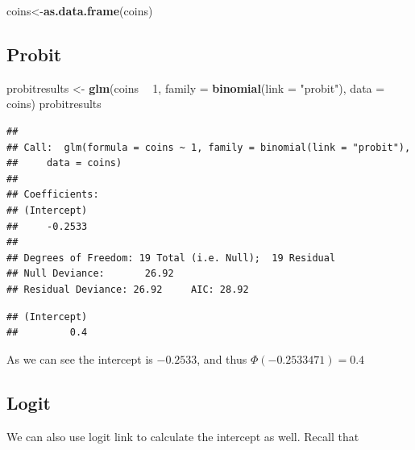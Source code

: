 \documentclass[
]{book}
\newenvironment{Shaded}{\begin{snugshade}}{\end{snugshade}}
\newcommand{\DataTypeTok}[1]{\textcolor[rgb]{0.13,0.29,0.53}{#1}}
\newcommand{\DecValTok}[1]{\textcolor[rgb]{0.00,0.00,0.81}{#1}}
\newcommand{\KeywordTok}[1]{\textcolor[rgb]{0.13,0.29,0.53}{\textbf{#1}}}
\newcommand{\NormalTok}[1]{#1}
\newcommand{\OperatorTok}[1]{\textcolor[rgb]{0.81,0.36,0.00}{\textbf{#1}}}
\newcommand{\StringTok}[1]{\textcolor[rgb]{0.31,0.60,0.02}{#1}}
\begin{document}
\begin{Shaded}
\begin{Highlighting}[]
\NormalTok{coins<-}\KeywordTok{as.data.frame}\NormalTok{(coins)}
\end{Highlighting}
\end{Shaded}

\hypertarget{probit-1}{%
\subsection{Probit}\label{probit-1}}

\begin{Shaded}
\begin{Highlighting}[]
\NormalTok{probitresults <-}\StringTok{ }\KeywordTok{glm}\NormalTok{(coins }\OperatorTok{~}\StringTok{ }\DecValTok{1}\NormalTok{, }\DataTypeTok{family =} \KeywordTok{binomial}\NormalTok{(}\DataTypeTok{link =} \StringTok{"probit"}\NormalTok{), }\DataTypeTok{data =}\NormalTok{ coins)}
\NormalTok{probitresults}
\end{Highlighting}
\end{Shaded}

\begin{verbatim}
## 
## Call:  glm(formula = coins ~ 1, family = binomial(link = "probit"), 
##     data = coins)
## 
## Coefficients:
## (Intercept)  
##     -0.2533  
## 
## Degrees of Freedom: 19 Total (i.e. Null);  19 Residual
## Null Deviance:       26.92 
## Residual Deviance: 26.92     AIC: 28.92
\end{verbatim}

\begin{Shaded}
\end{Shaded}

\begin{verbatim}
## (Intercept) 
##         0.4
\end{verbatim}

As we can see the intercept is \(-0.2533\), and thus \(\Phi(-0.2533471)=0.4\)

\hypertarget{logit-1}{%
\subsection{Logit}\label{logit-1}}

We can also use logit link to calculate the intercept as well. Recall that
\end{document}
